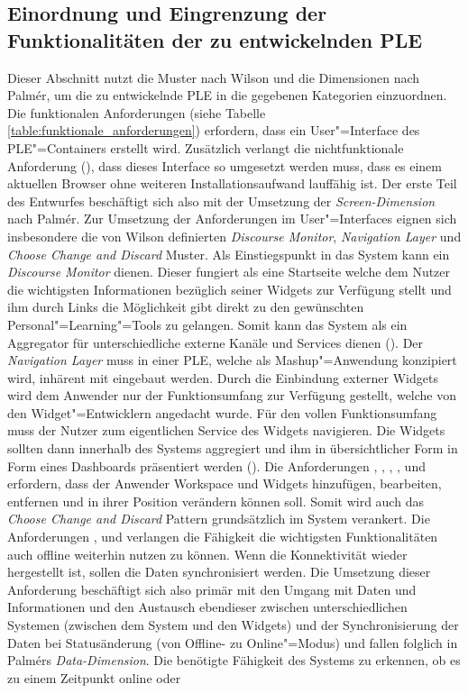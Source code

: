 \subsection{Einordnung und Eingrenzung der Funktionalitäten der zu entwickelnden \acs{PLE}}
Dieser Abschnitt nutzt die Muster nach Wilson und die Dimensionen nach Palmér, um die zu entwickelnde \ac{PLE} in die gegebenen Kategorien einzuordnen.
Die funktionalen Anforderungen (siehe Tabelle \ref{table:funktionale_anforderungen}) erfordern, dass ein User"=Interface des \ac{PLE}"=Containers erstellt wird. Zusätzlich verlangt die nichtfunktionale Anforderung (), dass dieses Interface so umgesetzt werden muss, dass es einem aktuellen Browser ohne weiteren Installationsaufwand lauffähig ist. Der erste Teil des Entwurfes beschäftigt sich also mit der Umsetzung der \emph{Screen-Dimension} nach Palmér. Zur Umsetzung der Anforderungen im User"=Interfaces eignen sich insbesondere die von Wilson definierten \emph{Discourse Monitor}, \emph{Navigation Layer} und \emph{Choose Change and Discard} Muster. Als Einstiegspunkt in das System kann ein \emph{Discourse Monitor} dienen. Dieser fungiert als eine Startseite welche dem Nutzer die wichtigsten Informationen bezüglich seiner Widgets zur Verfügung stellt  und ihm durch Links die Möglichkeit gibt direkt zu den gewünschten Personal"=Learning"=Tools zu gelangen. Somit kann das System als ein Aggregator für unterschiedliche externe Kanäle und Services dienen (). Der \emph{Navigation Layer} muss in einer \ac{PLE}, welche als Mashup"=Anwendung konzipiert wird, inhärent mit eingebaut werden. Durch die Einbindung externer Widgets wird dem Anwender nur der Funktionsumfang zur Verfügung gestellt, welche von den Widget"=Entwicklern angedacht wurde. Für den vollen Funktionsumfang muss der Nutzer zum eigentlichen Service des Widgets navigieren. Die Widgets sollten dann innerhalb des Systems aggregiert und ihm in übersichtlicher Form in Form eines Dashboards präsentiert werden (). Die Anforderungen , , , ,  und  erfordern, dass der Anwender Workspace und Widgets hinzufügen, bearbeiten, entfernen und in ihrer Position verändern können soll. Somit wird auch das \emph{Choose Change and Discard} Pattern grundsätzlich im System verankert. Die Anforderungen ,  und  verlangen die Fähigkeit die wichtigsten Funktionalitäten auch offline weiterhin nutzen zu können. Wenn die Konnektivität wieder hergestellt ist, sollen die Daten synchronisiert werden. Die Umsetzung dieser Anforderung beschäftigt sich also primär mit den Umgang mit Daten und Informationen und den Austausch ebendieser zwischen unterschiedlichen Systemen (zwischen dem System und den Widgets) und der Synchronisierung der Daten bei Statusänderung (von Offline- zu Online"=Modus) und fallen folglich in Palmérs \emph{Data-Dimension}. Die benötigte Fähigkeit des Systems zu erkennen, ob es zu einem Zeitpunkt online oder 